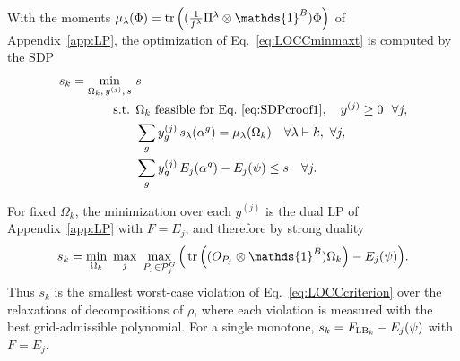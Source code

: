 \documentclass[11pt,a4paper]{report}
\newcommand{\one}{\mathds{1}}
\newcommand{\I}{\one}
\renewcommand{\a}{\alpha}
\newcounter{reptag}
\newif\iftags \tagsfalse   %
\newcommand{\reptagbox}[3]{\iftags\par\smallskip\noindent\refstepcounter{reptag}%
  \fcolorbox{#1}{#1!7}{\parbox{\dimexpr\linewidth-2\fboxsep-2\fboxrule\relax}{\small
  \textcolor{#1}{\textbf{[\thereptag]\ #2.}}\ #3}}\par\smallskip\fi}
\newcommand{\detail}[1]{\reptagbox{tagD}{More detail}{#1}}
\begin{document}
With the moments $\mu_\lambda(\Phi)=\tr\left((\tfrac{1}{f^\lambda}\Pi^\lambda\otimes\I^B)\Phi\right)$ of Appendix~\ref{app:LP}, the optimization of Eq.~\eqref{eq:LOCCminmaxt} is computed by the SDP
\begin{align}\label{eq:LOCCsdp}
    s_k=\min_{\Omega_k,\,y^{(j)},\,s}\ & s\\
    \text{s.t. }& \Omega_k\ \text{feasible for Eq.~\eqref{eq:SDPcroof1}},\quad y^{(j)}\geq0\ \ \forall j, \nonumber\\
    & \sum_g y^{(j)}_g\,s_\lambda(\a^g)=\mu_\lambda(\Omega_k)\quad\forall\lambda\vdash k,\ \forall j, \nonumber\\
    & \sum_g y^{(j)}_g\,E_j(\a^g)-E_j(\psi)\leq s\quad\forall j. \nonumber
\end{align}
\detail{Mention that this SDP was infeasible for pure and low-rank targets until the polynomial coefficients were bounded ($|c|\le100$), and that it uses a fixed $1/60$ lattice because cutting planes were too slow there.}

For fixed $\Omega_k$, the minimization over each $y^{(j)}$ is the dual LP of Appendix~\ref{app:LP} with $F=E_j$, and therefore by strong duality
\begin{equation}\label{eq:LOCCminmax}
    s_k=\min_{\Omega_k}\ \max_{j}\ \max_{P_j\in\mathcal{P}^G_j}\Big(\tr\left((O_{P_j}\otimes\I^B) \Omega_k\right)-E_j(\psi)\Big).
\end{equation}
Thus $s_k$ is the smallest worst-case violation of Eq.~\eqref{eq:LOCCcriterion} over the relaxations of decompositions of $\rho$, where each violation is measured with the best grid-admissible polynomial. For a single monotone, $s_k=F_{{\rm LB}_k}-E_j(\psi)$ with $F=E_j$.
\end{document}

